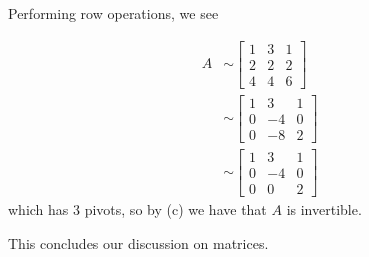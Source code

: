 \begin{solution}
Performing row operations, we see

\[
\begin{aligned}
A & \sim\left[\begin{array}{lll}
1 & 3 & 1 \\
2 & 2 & 2 \\
4 & 4 & 6
\end{array}\right] \\
& \sim\left[\begin{array}{ccc}
1 & 3 & 1 \\
0 & -4 & 0 \\
0 & -8 & 2
\end{array}\right] \\
& \sim\left[\begin{array}{ccc}
1 & 3 & 1 \\
0 & -4 & 0 \\
0 & 0 & 2
\end{array}\right]
\end{aligned}
\]
which has 3 pivots, so by (c) we have that $A$ is invertible.
\end{solution}

This concludes our discussion on matrices.